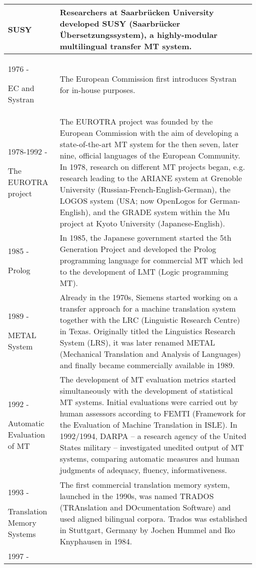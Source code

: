 \begin{longtable}[c]{ |>{\raggedright}p{2.8cm}||p{8.5cm}|  }
 SUSY & Researchers at Saarbrücken University developed SUSY (Saarbrücker Übersetzungssystem), a highly-modular multilingual transfer MT system.\\ \hline
 1976 - 
 
 EC and Systran & The European Commission first introduces Systran for in-house purposes.\\ \hline
 1978-1992 - 
 
 The EUROTRA project & The EUROTRA project was founded by the European Commission with the aim of developing a state-of-the-art MT system for the then seven, later nine, official languages of the European Community. In 1978, research on different MT projects began, e.g. research leading to the ARIANE system at Grenoble University (Russian-French-English-German), the LOGOS system (USA; now OpenLogos for German-English), and the GRADE system within the Mu project at Kyoto University (Japanese-English).\\ \hline
 1985 - 
 
 Prolog & In 1985, the Japanese government started the 5th Generation Project and developed the Prolog programming language for commercial MT which led to the development of LMT (Logic programming MT).\\ \hline
 1989 - 
 
 METAL System & Already in the 1970s, Siemens started working on a transfer approach for a machine translation system together with the LRC (Linguistic Research Centre) in Texas. Originally titled the Linguistics Research System (LRS), it was later renamed METAL (Mechanical Translation and Analysis of Languages) and finally became commercially available in 1989.\\ \hline
 1992 - 
 
 Automatic Evaluation of MT & The development of MT evaluation metrics started simultaneously with the development of statistical MT systems. Initial evaluations were carried out by human assessors according to FEMTI (Framework for the Evaluation of Machine Translation in ISLE). In 1992/1994, DARPA -- a research agency of the United States military -- investigated unedited output of MT systems, comparing automatic measures and human judgments of adequacy, fluency, informativeness.\\ \hline
 1993 - 
 
 Translation Memory Systems & The first commercial translation memory system, launched in the 1990s, was named TRADOS (TRAnslation and DOcumentation Software) and used aligned bilingual corpora. Trados was established in Stuttgart, Germany by Jochen Hummel and Iko Knyphausen in 1984. \\ \hline
 1997 - 
 

\end{longtable}
